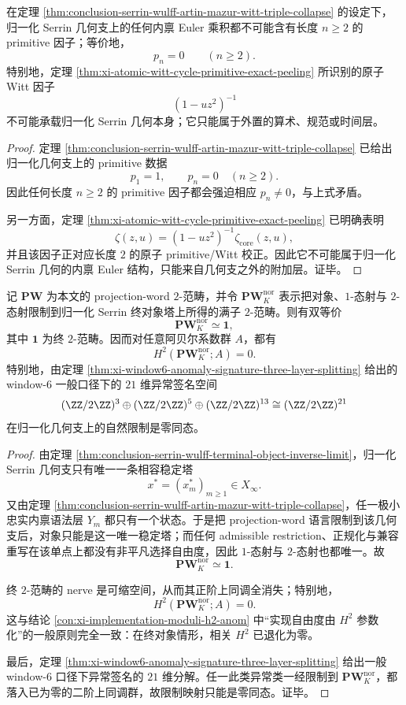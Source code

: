 \begin{corollary}\label{cor:conclusion-serrin-wulff-no-higher-primitive-intrinsic}
在定理 \ref{thm:conclusion-serrin-wulff-artin-mazur-witt-triple-collapse} 的设定下，归一化 Serrin 几何支上的任何内禀 Euler 乘积都不可能含有长度 \(n\ge 2\) 的 primitive 因子；等价地，
\[
p_n=0\qquad(n\ge 2).
\]
特别地，定理 \ref{thm:xi-atomic-witt-cycle-primitive-exact-peeling} 所识别的原子 Witt 因子
\[
(1-uz^2)^{-1}
\]
不可能承载归一化 Serrin 几何本身；它只能属于外置的算术、规范或时间层。
\end{corollary}
\begin{proof}
定理 \ref{thm:conclusion-serrin-wulff-artin-mazur-witt-triple-collapse} 已给出归一化几何支上的 primitive 数据
\[
p_1=1,
\qquad
p_n=0\quad(n\ge 2).
\]
因此任何长度 \(n\ge 2\) 的 primitive 因子都会强迫相应 \(p_n\neq 0\)，与上式矛盾。

另一方面，定理 \ref{thm:xi-atomic-witt-cycle-primitive-exact-peeling} 已明确表明
\[
\zeta(z,u)=(1-uz^2)^{-1}\zeta_{\mathrm{core}}(z,u),
\]
并且该因子正对应长度 \(2\) 的原子 primitive/Witt 校正。因此它不可能属于归一化 Serrin 几何的内禀 Euler 结构，只能来自几何支之外的附加层。证毕。
\end{proof}

\begin{theorem}[归一化几何支上的异常上同调消失]\label{thm:conclusion-serrin-wulff-anomaly-h2-vanishing}
记 \(\mathbf{PW}\) 为本文的 projection-word \(2\)-范畴，并令 \(\mathbf{PW}_K^{\mathrm{nor}}\) 表示把对象、\(1\)-态射与 \(2\)-态射限制到归一化 Serrin 终对象塔上所得的满子 \(2\)-范畴。则有双等价
\[
\mathbf{PW}_K^{\mathrm{nor}}\simeq \mathbf 1,
\]
其中 \(\mathbf 1\) 为终 \(2\)-范畴。因而对任意阿贝尔系数群 \(A\)，都有
\[
H^2(\mathbf{PW}_K^{\mathrm{nor}};A)=0.
\]
特别地，由定理 \ref{thm:xi-window6-anomaly-signature-three-layer-splitting} 给出的 window-\(6\) 一般口径下的 \(21\) 维异常签名空间
\[
(\ZZ/2\ZZ)^3\oplus(\ZZ/2\ZZ)^5\oplus(\ZZ/2\ZZ)^{13}\cong(\ZZ/2\ZZ)^{21}
\]
在归一化几何支上的自然限制是零同态。
\end{theorem}
\begin{proof}
由定理 \ref{thm:conclusion-serrin-wulff-terminal-object-inverse-limit}，归一化 Serrin 几何支只有唯一一条相容稳定塔
\[
x^\ast=(x_m^\ast)_{m\ge 1}\in X_\infty.
\]
又由定理 \ref{thm:conclusion-serrin-wulff-artin-mazur-witt-triple-collapse}，任一极小忠实内禀语法层 \(Y_m\) 都只有一个状态。于是把 projection-word 语言限制到该几何支后，对象只能是这一唯一稳定塔；而任何 admissible restriction、正规化与兼容重写在该单点上都没有非平凡选择自由度，因此 \(1\)-态射与 \(2\)-态射也都唯一。故
\[
\mathbf{PW}_K^{\mathrm{nor}}\simeq \mathbf 1.
\]

终 \(2\)-范畴的 nerve 是可缩空间，从而其正阶上同调全消失；特别地，
\[
H^2(\mathbf{PW}_K^{\mathrm{nor}};A)=0.
\]
这与结论 \ref{con:xi-implementation-moduli-h2-anom} 中“实现自由度由 \(H^2\) 参数化”的一般原则完全一致：在终对象情形，相关 \(H^2\) 已退化为零。

最后，定理 \ref{thm:xi-window6-anomaly-signature-three-layer-splitting} 给出一般 window-\(6\) 口径下异常签名的 \(21\) 维分解。任一此类异常类一经限制到 \(\mathbf{PW}_K^{\mathrm{nor}}\)，都落入已为零的二阶上同调群，故限制映射只能是零同态。证毕。
\end{proof}

